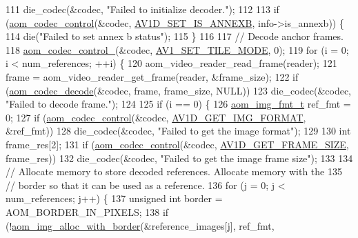 \begin{DoxyCodeInclude}
{{{{111     die\_codec(&codec, \textcolor{stringliteral}{"Failed to initialize decoder."});
112 
113   \textcolor{keywordflow}{if} (\hyperlink{group__codec_ga6da974f4eeaba1fa74106b28d0fe6ac5}{aom\_codec\_control}(&codec, \hyperlink{group__aom__decoder_gga3865fd4b3192489baa9a5c3632ebe97ba1fb269c5c5913d9995b6c35d28e2a788}{AV1D\_SET\_IS\_ANNEXB}, info->is\_annexb)) \{
114     die(\textcolor{stringliteral}{"Failed to set annex b status"});
115   \}
116 
117   \textcolor{comment}{// Decode anchor frames.}
118   \hyperlink{group__codec_ga51eb332a40dcacc39000ab8e0be36b79}{aom\_codec\_control\_}(&codec, \hyperlink{group__aom__decoder_gga3865fd4b3192489baa9a5c3632ebe97ba0795d8084ae8c78528c01587198df9e2}{AV1\_SET\_TILE\_MODE}, 0);
119   \textcolor{keywordflow}{for} (i = 0; i < num\_references; ++i) \{
120     aom\_video\_reader\_read\_frame(reader);
121     frame = aom\_video\_reader\_get\_frame(reader, &frame\_size);
122     \textcolor{keywordflow}{if} (\hyperlink{group__decoder_gab03fdb999d1f83a5896869a3ba5f68f7}{aom\_codec\_decode}(&codec, frame, frame\_size, NULL))
123       die\_codec(&codec, \textcolor{stringliteral}{"Failed to decode frame."});
124 
125     \textcolor{keywordflow}{if} (i == 0) \{
126       \hyperlink{aom__image_8h_ab71efff8c7f49380fad23b93bc2e9bfc}{aom\_img\_fmt\_t} ref\_fmt = 0;
127       \textcolor{keywordflow}{if} (\hyperlink{group__codec_ga6da974f4eeaba1fa74106b28d0fe6ac5}{aom\_codec\_control}(&codec, \hyperlink{group__aom__decoder_gga3865fd4b3192489baa9a5c3632ebe97bacd7229e5fb766670fe995739931c2ee3}{AV1D\_GET\_IMG\_FORMAT}, &ref\_fmt))
128         die\_codec(&codec, \textcolor{stringliteral}{"Failed to get the image format"});
129 
130       \textcolor{keywordtype}{int} frame\_res[2];
131       \textcolor{keywordflow}{if} (\hyperlink{group__codec_ga6da974f4eeaba1fa74106b28d0fe6ac5}{aom\_codec\_control}(&codec, \hyperlink{group__aom__decoder_gga3865fd4b3192489baa9a5c3632ebe97ba175c454a7adf2d3927a0e979b4a2b07b}{AV1D\_GET\_FRAME\_SIZE}, frame\_res))
132         die\_codec(&codec, \textcolor{stringliteral}{"Failed to get the image frame size"});
133 
134       \textcolor{comment}{// Allocate memory to store decoded references. Allocate memory with the}
135       \textcolor{comment}{// border so that it can be used as a reference.}
136       \textcolor{keywordflow}{for} (j = 0; j < num\_references; j++) \{
137         \textcolor{keywordtype}{unsigned} \textcolor{keywordtype}{int} border = AOM\_BORDER\_IN\_PIXELS;
138         \textcolor{keywordflow}{if} (!\hyperlink{aom__image_8h_aeb211e5184687f7e10d7c5bed4dcfdcd}{aom\_img\_alloc\_with\_border}(&reference\_images[j], ref\_fmt,
}}}}
\end{DoxyCodeInclude}
